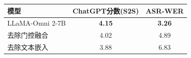 \begin{table}[!htbp]
    \label{tab:llamaomni2_ablation}
    \centering
    \small
    \begin{tabular}{lcc}
        \toprule
        \textbf{模型} & \textbf{ChatGPT分数(S2S)} & \textbf{ASR-WER} \\
        \midrule
        LLaMA-Omni 2-7B & \textbf{4.15} & \textbf{3.26} \\
        \quad 去除门控融合 & 4.02 & 4.89 \\
        \quad\quad 去除文本嵌入 & 3.88 & 6.83 \\
        \bottomrule
    \end{tabular}
\end{table}
